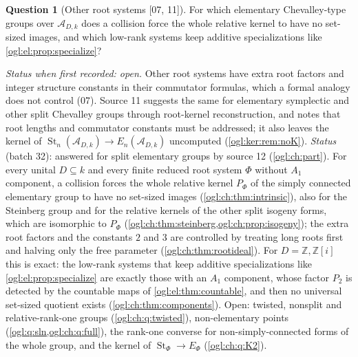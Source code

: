 \documentclass[11pt,oneside]{article}
\numberwithin{equation}{section}
\theoremstyle{definition}
\newtheorem{question}[question]{Question}
\theoremstyle{remark}
\newcommand{\Z}{\mathbb Z}
\newcommand{\A}{\mathcal A}
\newcommand{\St}{\operatorname{St}}
\newcommand{\src}[1]{\textup{\textsf{\small[#1]}}}
\begin{document}
\begin{question}[Other root systems \src{07, 11}]\label{ogl:q:roots}
For which elementary Chevalley-type groups over $\A_{D,k}$ does a collision force
the whole relative kernel to have no set-sized images, and which low-rank systems
keep additive specializations like \cref{ogl:el:prop:specialize}?
\end{question}
\emph{Status when first recorded: open.} Other root systems have extra root factors and integer
structure constants in their commutator formulas, which a formal analogy does not
control (07). Source 11 suggests the same for elementary symplectic and other
split Chevalley groups through root-kernel reconstruction, and notes that root
lengths and commutator constants must be addressed; it also leaves the kernel of
$\St_n(\A_{D,k})\to E_n(\A_{D,k})$ uncomputed (\cref{ogl:ker:rem:noK}).
\emph{Status} (batch 32): answered for split elementary groups by source 12
(\cref{ogl:ch:part}). For every unital $D\subseteq k$ and every finite reduced
root system $\Phi$ without $A_1$ component, a collision forces the whole relative
kernel $P_\Phi$ of the simply connected elementary group to have no set-sized
images (\cref{ogl:ch:thm:intrinsic}), also for the Steinberg group and for the
relative kernels of the other split isogeny forms, which are isomorphic to
$P_\Phi$ (\cref{ogl:ch:thm:steinberg,ogl:ch:prop:isogeny}); the extra root factors
and the constants $2$ and $3$ are controlled by treating long roots first and
halving only the free parameter (\cref{ogl:ch:thm:rootideal}). For $D=\Z,\Z[i]$
this is exact: the low-rank systems that keep additive specializations like
\cref{ogl:el:prop:specialize} are exactly those with an $A_1$ component, whose
factor $P_2$ is detected by the countable maps of \cref{ogl:el:thm:countable},
and then no universal set-sized quotient exists
(\cref{ogl:ch:thm:components}). Open: twisted, nonsplit and relative-rank-one
groups (\cref{ogl:ch:q:twisted}), non-elementary points
(\cref{ogl:q:sln,ogl:ch:q:full}), the rank-one converse for non-simply-connected
forms of the whole group, and the kernel of $\St_\Phi\to E_\Phi$
(\cref{ogl:ch:q:K2}).
\end{document}
